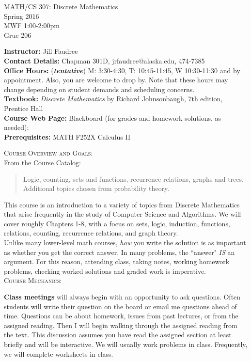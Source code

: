 \documentclass[11pt]{article}
\begin{document}
\begin{center}MATH/CS 307:  Discrete Mathematics \\ Spring 2016 \\ MWF 1:00-2:00pm \\ Grue 206
\end{center}

\hrulefill

\textbf{Instructor:} Jill Faudree\\
\textbf{Contact Details:} Chapman 301D, jrfaudree@alaska.edu, 474-7385\\
\textbf{Office Hours:} (\textbf{\emph{tentative}})  M: 3:30-4:30, T: 10:45-11:45, W 10:30-11:30 and by appointment. Also, you are welcome to drop by. Note that these hours may change depending on student demands and scheduling concerns.\\
\textbf{Textbook:} \emph{Discrete Mathematics} by Richard Johnsonbaugh, 7th edition, Prentice Hall\\
\textbf{Course Web Page:} Blackboard (for grades and homework solutions, as needed); \\
\textbf{Prerequisites:} MATH F252X Calculus II \\
\hrulefill

\textsc{Course Overview and Goals:}\\

 From the Course Catalog:
\begin{quote}
Logic, counting, sets and functions, recurrence relations, graphs and trees. Additional topics chosen from probability theory.  \end{quote}

This course is an introduction to a variety of topics from Discrete Mathematics that arise frequently in the study of Computer Science and Algorithms. We will cover roughly Chapters 1-8, with a focus on  sets, logic, induction, functions, relations, counting, recurrence relations, and graph theory.\\

Unlike many lower-level math courses, {\it{how}} you write the solution is as  important as whether you get the correct answer. In many problems, the ``answer" \emph{IS} an argument. For this reason, attending class, taking notes, working homework problems, checking worked solutions and graded work is imperative. \\

\textsc{Course Mechanics}:

\textbf{Class meetings} will always begin with an opportunity to ask questions. Often students will write their question on the board or email me questions ahead of time. Questions can be about homework, issues from past lectures, or from the assigned reading. Then I will begin walking through the assigned reading from the text.  This discussion assumes you have read the assigned section at least briefly and will be interactive. We will usually work problems in class. Frequently, we will complete worksheets in class. \\
\end{document}

